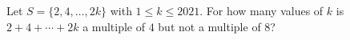 Let $S=\{2,4,\dots,2k\}$ with $1\le k\le2021$. For how many values of $k$ is $2+4+\cdots+2k$ a multiple of $4$ but not a multiple of $8$?
